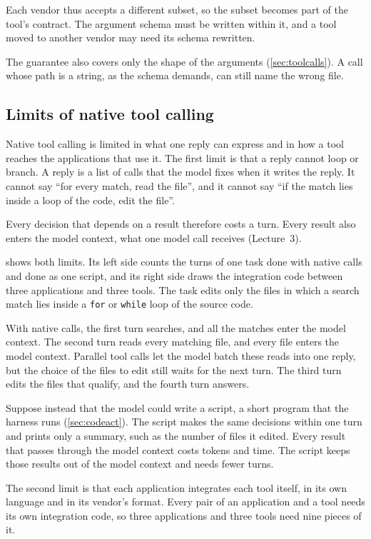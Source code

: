 Each vendor thus accepts a different subset, so the subset becomes part of the tool's contract. The
argument schema must be written within it, and a tool moved to another vendor may need its schema
rewritten.

The guarantee also covers only the shape of the arguments (\cref{sec:toolcalls}). A call whose path
is a string, as the schema demands, can still name the wrong file.

\subsection{Limits of native tool calling}
\label{sec:native-limits}

Native tool calling is limited in what one reply can express and in how a tool reaches the applications
that use it. The first limit is that a reply cannot loop or branch. A reply is a list of calls that
the model fixes when it writes the reply. It cannot say ``for every match, read the file'', and it
cannot say ``if the match lies inside a loop of the code, edit the file''.

Every decision that depends on a result therefore costs a turn. Every result also enters the model
context, what one model call receives (Lecture~3).

 shows both limits. Its left side counts the turns of one task done with
native calls and done as one script, and its right side draws the integration code between three
applications and three tools. The task edits only the files in which a search match lies inside a
\texttt{for} or \texttt{while} loop of the source code.

With native calls, the first turn searches, and all the matches enter the model context. The second turn
reads every matching file, and every file enters the model context. Parallel tool calls let the model
batch these reads into one reply, but the choice of the files to edit still waits for the next turn.
The third turn edits the files that qualify, and the fourth turn answers.

Suppose instead that the model could write a script, a short program that the harness runs
(\cref{sec:codeact}). The script makes the same decisions within one turn and prints only a summary,
such as the number of files it edited. Every result that passes through the model context costs tokens and
time. The script keeps those results out of the model context and needs fewer turns.

The second limit is that each application integrates each tool itself, in its own language and in
its vendor's format. Every pair of an application and a tool needs its own integration code, so
three applications and three tools need nine pieces of it.

